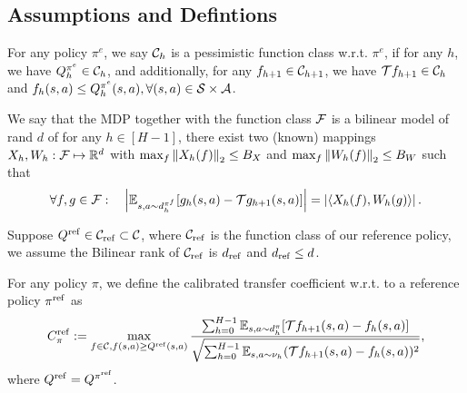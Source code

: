 \subsection{Assumptions and Defintions}
\label{subsec:CalQL-assumptions}
\begin{assumption} 
\label{assump:conservative-realizability-completeness}
For any policy $\pi^e$, we say $\mathcal C_h$ is a pessimistic function class w.r.t. $\pi^e$, if for any $h$, we have $Q^{\pi^e}_h\in \mathcal C_h$, and additionally, for any $f_{h+1}\in \mathcal C_{h+1}$, we have $\mathcal T f_{h+1}\in \mathcal C_h$ and $f_h(s,a)\leq Q_h^{\pi^e}(s,a),\forall (s,a)\in \mathcal S\times \mathcal A$.
\end{assumption}

\begin{definition}
\label{def:bilinear-model}
We say that the MDP together with the function class $\mathcal F$ is a bilinear model of rand $d$ of for any $h\in [H-1]$, there exist two (known) mappings $X_h,W_h:\mathcal F\mapsto \mathbb R^d$ with $\max_f\left\| X_h(f) \right\|_{2}\leq B_X$ and $\max_f\left\| W_h(f) \right\|_{2}\leq B_W$ such that 
\begin{equation}
    \label{eq:bilinear-model}
    \forall f, g \in \mathcal F:\quad \left| \mathbb E_{s,a\sim d_h^{\pi^f}} [g_h(s,a)-\mathcal Tg_{h+1}(s,a)] \right| = \left| \left\langle X_h(f), W_h(g) \right\rangle \right|.
\end{equation}
\end{definition}

\begin{assumption}
\label{assump:conservative-bilinear-rank}
Suppose $Q^{\mathrm{ref}}\in\mathcal C_\mathrm{ref}\subset\mathcal C$, where $\mathcal C_\mathrm{ref}$ is the function class of our reference policy, we assume the Bilinear rank of $\mathcal C_\mathrm{ref}$ is $d_\mathrm{ref}$ and $d_\mathrm{ref}\leq d$.
\end{assumption}


\begin{definition}
\label{def:bellman-error-coeff-ref}
For any policy $\pi$, we define the calibrated transfer coefficient w.r.t. to a reference policy $\pi^\mathrm{ref}$ as 
\begin{equation}
    C^\mathrm{ref}_\pi:=\max_{f\in \mathcal C,f(s,a)\geq Q^\mathrm{ref}(s,a)}\frac{\sum_{h=0}^{H-1}\mathbb E_{s,a\sim d_h^\pi}[\mathcal T f_{h+1}(s,a)-f_h(s,a)]}{\sqrt{\sum_{h=0}^{H-1}\mathbb E_{s,a\sim \nu_h}(\mathcal T f_{h+1}(s,a)-f_h(s,a))^2}},
\end{equation}
where $Q^\mathrm{ref} = Q^{\pi^\mathrm{ref}}$.
\end{definition}


